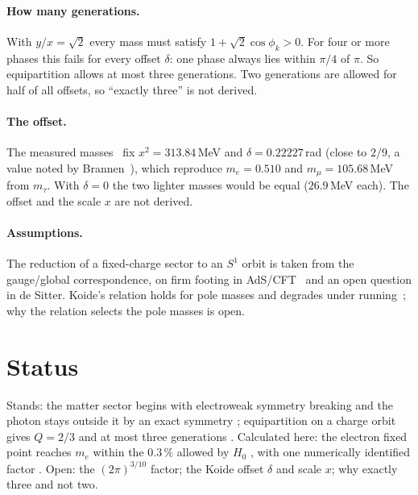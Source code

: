 \paragraph{How many generations.} With $y/x=\sqrt2$ every mass must satisfy $1+\sqrt2\cos\phi_k>0$. For four or more phases this fails for every
offset $\delta$: one phase always lies within $\pi/4$ of $\pi$. So equipartition allows at most three generations. Two generations are allowed for half
of all offsets, so ``exactly three'' is not derived. \calc
\paragraph{The offset.} The measured masses~\cite{PDG2022} fix $x^2=313.84$\,MeV and $\delta=0.22227$\,rad (close to $2/9$, a value noted by Brannen~\cite{Brannen2010}), which reproduce
$m_e=0.510$ and $m_\mu=105.68$\,MeV from $m_\tau$. With $\delta=0$ the two lighter masses would be equal ($26.9$\,MeV each). The offset and the scale $x$
are not derived. \openprob
\paragraph{Assumptions.} The reduction of a fixed-charge sector to an $S^1$ orbit is taken from the gauge/global correspondence, on firm footing in
AdS/CFT~\cite{Maldacena1999} and an open question in de Sitter. Koide's relation holds for pole masses and degrades under running~\cite{Xing2006}; why the relation selects the pole masses is open. \openprob

\section{Status}
Stands: the matter sector begins with electroweak symmetry breaking and the photon stays outside it by an exact symmetry \derived; equipartition on a
charge orbit gives $Q=2/3$ and at most three generations \derived. Calculated here: the electron fixed point reaches $m_e$ within the $0.3\,\%$ allowed
by $H_0$ \calc, with one numerically identified factor \fitted. Open: the $(2\pi)^{3/10}$ factor; the Koide offset $\delta$ and scale $x$; why exactly three and not two. \openprob
